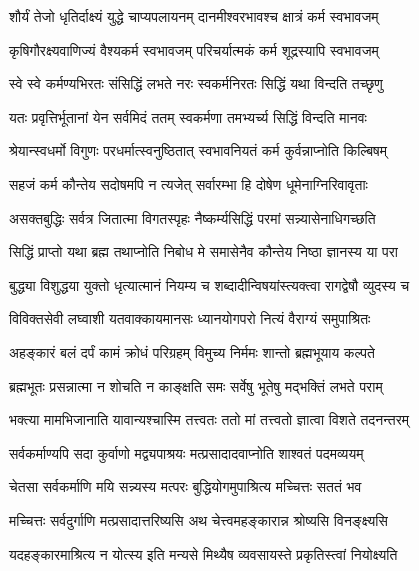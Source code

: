 \twolineshloka
{शौर्यं तेजो धृतिर्दाक्ष्यं युद्धे चाप्यपलायनम्}
{दानमीश्वरभावश्च क्षात्रं कर्म स्वभावजम्}%

\twolineshloka
{कृषिगौरक्ष्यवाणिज्यं वैश्यकर्म स्वभावजम्}
{परिचर्यात्मकं कर्म शूद्रस्यापि स्वभावजम्}%

\twolineshloka
{स्वे स्वे कर्मण्यभिरतः संसिद्धिं लभते नरः}
{स्वकर्मनिरतः सिद्धिं यथा विन्दति तच्छृणु}%

\twolineshloka
{यतः प्रवृत्तिर्भूतानां येन सर्वमिदं ततम्}
{स्वकर्मणा तमभ्यर्च्य सिद्धिं विन्दति मानवः}%

\twolineshloka
{श्रेयान्स्वधर्मो विगुणः परधर्मात्स्वनुष्ठितात्}
{स्वभावनियतं कर्म कुर्वन्नाप्नोति किल्बिषम्}%

\twolineshloka
{सहजं कर्म कौन्तेय सदोषमपि न त्यजेत्}
{सर्वारम्भा हि दोषेण धूमेनाग्निरिवावृताः}%

\twolineshloka
{असक्तबुद्धिः सर्वत्र जितात्मा विगतस्पृहः}
{नैष्कर्म्यसिद्धिं परमां सन्न्यासेनाधिगच्छति}%

\twolineshloka
{सिद्धिं प्राप्तो यथा ब्रह्म तथाप्नोति निबोध मे}
{समासेनैव कौन्तेय निष्ठा ज्ञानस्य या परा}%

\twolineshloka
{बुद्ध्या विशुद्धया युक्तो धृत्यात्मानं नियम्य च}
{शब्दादीन्विषयांस्त्यक्त्वा रागद्वेषौ व्युदस्य च}%

\twolineshloka
{विविक्तसेवी लघ्वाशी यतवाक्कायमानसः}
{ध्यानयोगपरो नित्यं वैराग्यं समुपाश्रितः}%

\twolineshloka
{अहङ्कारं बलं दर्पं कामं क्रोधं परिग्रहम्}
{विमुच्य निर्ममः शान्तो ब्रह्मभूयाय कल्पते}%

\twolineshloka
{ब्रह्मभूतः प्रसन्नात्मा न शोचति न काङ्क्षति}
{समः सर्वेषु भूतेषु मद्भक्तिं लभते पराम्}%

\twolineshloka
{भक्त्या मामभिजानाति यावान्यश्चास्मि तत्त्वतः}
{ततो मां तत्त्वतो ज्ञात्वा विशते तदनन्तरम्}%

\twolineshloka
{सर्वकर्माण्यपि सदा कुर्वाणो मद्व्यपाश्रयः}
{मत्प्रसादादवाप्नोति शाश्वतं पदमव्ययम्}%

\twolineshloka
{चेतसा सर्वकर्माणि मयि सन्न्यस्य मत्परः}
{बुद्धियोगमुपाश्रित्य मच्चित्तः सततं भव}%

\twolineshloka
{मच्चित्तः सर्वदुर्गाणि मत्प्रसादात्तरिष्यसि}
{अथ चेत्त्वमहङ्कारान्न श्रोष्यसि विनङ्क्ष्यसि}%

\twolineshloka
{यदहङ्कारमाश्रित्य न योत्स्य इति मन्यसे}
{मिथ्यैष व्यवसायस्ते प्रकृतिस्त्वां नियोक्ष्यति}%

